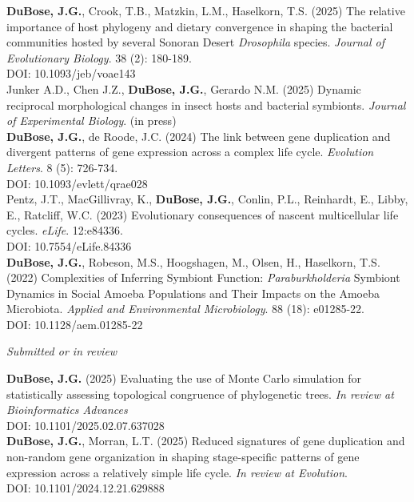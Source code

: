 \documentclass{article}
\begin{document}
\hangindent=0.7cm \textbf{DuBose, J.G.}, Crook, T.B., Matzkin, L.M., Haselkorn, T.S. (2025) The relative importance of host phylogeny and dietary convergence in shaping the bacterial communities hosted by several Sonoran Desert \emph{Drosophila} species. \emph{Journal of Evolutionary Biology}. 38 (2): 180-189.\\ 
DOI: 10.1093/jeb/voae143 \\

\hangindent=0.7cm Junker A.D., Chen J.Z., \textbf{DuBose, J.G.}, Gerardo N.M. (2025) Dynamic reciprocal morphological changes in insect hosts and bacterial symbionts. \emph{Journal of Experimental Biology}. (in press) \\

\hangindent=0.7cm \textbf{DuBose, J.G.}, de Roode, J.C. (2024) The link between gene duplication and divergent patterns of gene expression across a complex life cycle. \emph{Evolution Letters}. 8 (5): 726-734. \\
DOI: 10.1093/evlett/qrae028 \\

\hangindent=0.7cm Pentz, J.T., MacGillivray, K., \textbf{DuBose, J.G.}, Conlin, P.L., Reinhardt, E., Libby, E., Ratcliff, W.C. (2023) Evolutionary consequences of nascent multicellular life cycles. \emph{eLife}. 12:e84336. \\
DOI: 10.7554/eLife.84336 \\

\hangindent=0.7cm \textbf{DuBose, J.G.}, Robeson, M.S., Hoogshagen, M., Olsen, H., Haselkorn, T.S. (2022) Complexities of Inferring Symbiont Function: \emph{Paraburkholderia} Symbiont Dynamics in Social Amoeba Populations and Their Impacts on the Amoeba Microbiota. \emph{Applied and Environmental Microbiology}. 88 (18): e01285-22.\\
DOI: 10.1128/aem.01285-22 \\

\begin{flushleft}
\emph{Submitted or in review}
\end{flushleft}

\hangindent=0.7cm \textbf{DuBose, J.G.} (2025) Evaluating the use of Monte Carlo simulation for statistically assessing topological congruence of phylogenetic trees. \emph{In review at Bioinformatics Advances}\\
DOI: 10.1101/2025.02.07.637028 \\

\hangindent=0.7cm \textbf{DuBose, J.G.}, Morran, L.T. (2025) Reduced signatures of gene duplication and non-random gene organization in shaping stage-specific patterns of gene expression across a relatively simple life cycle. \emph{In review at Evolution}.\\ 
DOI: 10.1101/2024.12.21.629888 \\
\end{document}
